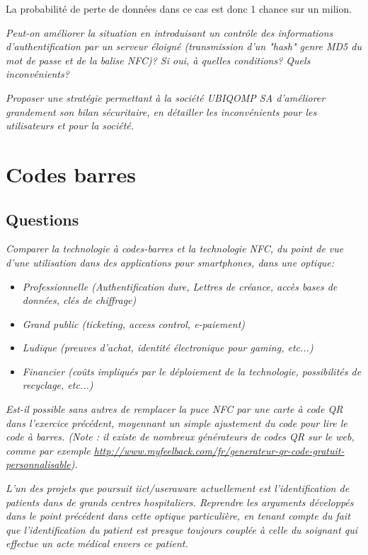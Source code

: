 \documentclass[a4paper,11pt,titlepage]{article}
\begin{document}
La probabilité de perte de données dans ce cas est donc 1 chance sur un milion.


\kant[1]

\textit{Peut-on améliorer la situation en introduisant un contrôle des informations d'authentification par un
serveur éloigné (transmission d'un "hash" genre MD5 du mot de passe et de la balise NFC)? Si oui, à quelles
conditions? Quels inconvénients?}


\textit{Proposer une stratégie permettant à la société UBIQOMP SA d'améliorer grandement son bilan
sécuritaire, en détailler les inconvénients pour les utilisateurs et pour la société.}

\section{Codes barres}
\subsection*{Questions}
\textit{Comparer la technologie à codes-barres et la technologie NFC, du point de vue d'une utilisation dans
des applications pour smartphones, dans une optique:}
\begin{itemize}
\item \textit{Professionnelle (Authentification dure, Lettres de créance, accès bases de données, clés de
	chiffrage)}
\item \textit{Grand public (ticketing, access control, e-paiement)}
\item \textit{Ludique (preuves d'achat, identité électronique pour gaming, etc...)}
\item \textit{Financier (coûts impliqués par le déploiement de la technologie, possibilités de recyclage, etc...)}
\end{itemize}

\textit{Est-il possible sans autres de remplacer la puce NFC par une carte à code QR dans l'exercice
précédent, moyennant un simple  ajustement du code pour lire le code à barres. (Note : il existe de
nombreux  générateurs  de codes  QR sur le web, comme par exemple
\url{http://www.myfeelback.com/fr/generateur-qr-code-gratuit-personnalisable}).}

\textit{L'un des projets que poursuit iict/useraware actuellement est l'identification de patients dans de
grands centres hospitaliers. Reprendre les arguments développés dans le point précédent dans cette
optique particulière, en tenant compte du fait que l'identification du patient est presque toujours couplée à
celle du soignant qui effectue un acte médical envers ce patient.}
\end{document}
